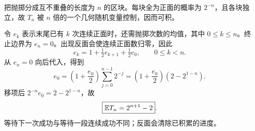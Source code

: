 把抛掷分成互不重叠的长度为 $n$ 的区块。每块全为正面的概率为 $2^{-n}$，且各块独立，故 $T_n$ 被 $n$ 倍的一个几何随机变量控制，因而可积。

令 $e_k$ 表示末尾已有 $k$ 次连续正面时，还需抛掷次数的均值，其中 $0\le k\le n$。终止边界为 $e_n=0$。出现反面会使连续正面数归零，因此
\[
 e_k=1+\tfrac12 e_{k+1}+\tfrac12e_0,
 \qquad 0\le k<n.
\]
从 $e_n=0$ 向后代入，得到
\[
 e_0=\left(1+\frac{e_0}{2}\right)
       \sum_{j=0}^{n-1}2^{-j}
     =\left(1+\frac{e_0}{2}\right)(2-2^{1-n}).
\]
移项后 $2^{-n}e_0=2-2^{1-n}$，故
\[
 \boxed{\mathbb{E} T_n=2^{n+1}-2}.
\]
等待下一次成功与等待一段连续成功不同；反面会清除已积累的进度。
